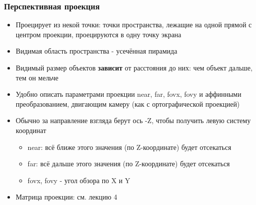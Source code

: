 \documentclass{beamer}
\begin{document}
\begin{frame}[fragile]
\frametitle{Перспективная проекция}
\begin{itemize}
\item Проецирует из некой точки: точки пространства, лежащие на одной прямой с центром проекции, проецируются в одну точку экрана
\pause
\item Видимая область пространства - усечённая пирамида
\pause
\item Видимый размер объектов \textbf{зависит} от расстояния до них: чем объект дальше, тем он мельче
\pause
\item Удобно описать параметрами проекции near, far, fovx, fovy и аффинными преобразованием, двигающим камеру (как с ортографической проекцией)
\pause
\item Обычно за направление взгляда берут ось -Z, чтобы получить левую систему координат
\pause
\begin{itemize}
\item near: всё ближе этого значения (по Z-координате) будет отсекаться
\pause
\item far: всё дальше этого значения (по Z-координате) будет отсекаться
\pause
\item fovx, fovy - угол обзора по X и Y
\end{itemize}
\pause
\item Матрица проекции: см. лекцию 4
\end{itemize}
\end{frame}
\end{document}
